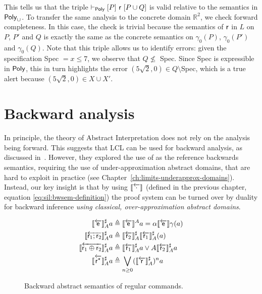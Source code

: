 \begin{example}
	This tells us that the triple $\vdash_{\mathsf{Poly}}\nobreak[P]~\mathsf{r}~[P \cup Q]$ is valid relative to the semantics in $\mathsf{Poly}_{\cup}$. To transfer the same analysis to the concrete domain $\mathbb{R}^2$, we  check forward completeness. In this case, the check is trivial because the semantics of $\mathsf{r}$ in $L$ on $P$, $P'$ and $Q$ is exactly the same as the concrete semantics on $\gamma_0(P)$, $\gamma_0(P')$ and $\gamma_0(Q)$.
	Note that this triple allows us to identify errors: given the specification Spec $= x \le 7$, we observe that $Q \nleq $ Spec. Since Spec is expressible in $\mathsf{Poly}$, this in turn highlights the error $(5 \sqrt{2}, 0) \in Q \setminus $Spec, which is a true alert because $(5 \sqrt{2}, 0) \in X \cup X'$.
\end{example}

\section{Backward analysis}

In principle, the theory of Abstract Interpretation does not rely on the analysis being forward. This suggests that LCL can be used for backward analysis, as discussed in~\cite[\S 5.3]{BGGR23}. However, they explored the use of \wlp{} as the reference backwards semantics, requiring the use of under\hyp{}approximation abstract domains, that are hard to exploit in practice (see Chapter~\ref{ch:limits-underapprox-domains}).
Instead, our key insight is that by using $\llbracket\overleftarrow{\cdot}\rrbracket$ (defined in the previous chapter, equation \eqref{eq:sil:bwsem-definition}) the proof system can be turned over by duality for backward inference \emph{using classical, over-approximation abstract domains}.

\begin{figure*}
	\begin{align*}
		\llbracket\overleftarrow{\mathsf{e}}\rrbracket^{\sharp}_{A} a                    & \triangleq \llbracket\overleftarrow{\mathsf{e}}\rrbracket^{A} a = \alpha \llbracket\overleftarrow{\mathsf{e}}\rrbracket \gamma (a)                \\
		\llbracket\overleftarrow{\mathsf{r}_1 ; \mathsf{r}_2}\rrbracket^{\sharp}_{A} a        & \triangleq \llbracket\overleftarrow{\mathsf{r}_2}\rrbracket^{\sharp}_{A} \llbracket\overleftarrow{\mathsf{r}_1}\rrbracket^{\sharp}_{A} (a)        \\
		\llbracket\overleftarrow{\mathsf{r}_1 \oplus \mathsf{r}_2}\rrbracket^{\sharp}_{A} a & \triangleq \llbracket\overleftarrow{\mathsf{r}_1}\rrbracket^{\sharp}_{A} a \vee A \llbracket\overleftarrow{\mathsf{r}_2}\rrbracket^{\sharp}_{A} a \\
		\llbracket\overleftarrow{\mathsf{r}^\star}\rrbracket^{\sharp}_{A} a             & \triangleq \bigvee_{n \ge 0}  (\llbracket\overleftarrow{\mathsf{r}}\rrbracket^{\sharp}_{A})^n a
	\end{align*}
	\caption{Backward abstract semantics of regular commands.}
	\label{fig:lcla:regcom-abs-sem-bw}
\end{figure*}

